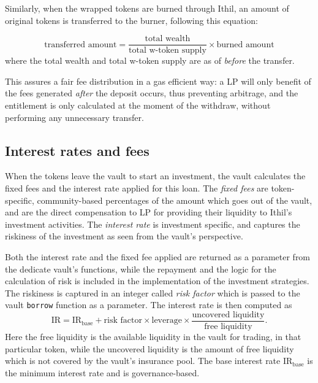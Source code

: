 \documentclass [10pt, fancyhdr, twoside] {article}
\begin{document}
Similarly, when the wrapped tokens are burned through Ithil, an amount of original tokens is transferred to the burner, following this equation:

\begin{equation}\label{transferEq}
\text{transferred amount} = \frac{ \text{total wealth}}{\text{total w-token supply}} \times\text{burned amount}
\end{equation}
where the total wealth and total w-token supply are as of \textit{before} the transfer.

This assures a fair fee distribution in a gas efficient way: a LP will only benefit of the fees generated \textit{after} the deposit occurs, thus preventing arbitrage, and the entitlement is only calculated at the moment of the withdraw, without performing any unnecessary transfer.

\subsection{Interest rates and fees}\label{subsectionInterestRates}
When the tokens leave the vault to start an investment, the vault calculates the fixed fees and the interest rate applied for this loan. The \textit{fixed fees} are token-specific, community-based percentages of the amount which goes out of the vault, and are the direct compensation to LP for providing their liquidity to Ithil's investment activities. The \textit{interest rate} is investment specific, and captures the riskiness of the investment as seen from the vault's perspective.

Both the interest rate and the fixed fee applied are returned as a parameter from the dedicate vault's functions, while the repayment and the logic for the calculation of risk is included in the implementation of the investment strategies. The riskiness is captured in an integer called \textit{risk factor} which is passed to the vault \verb|borrow| function as a parameter. The interest rate is then computed as
\begin{equation}\label{interestRate}
\text{IR} = \text{IR}_\text{base} + \text{risk factor}\times\text{leverage} \times\frac{\text{uncovered liquidity}}{\text{free liquidity}}.
\end{equation}
Here the free liquidity is the available liquidity in the vault for trading, in that particular token, while the uncovered liquidity is the amount of free liquidity which is not covered by the vault's insurance pool. The base interest rate $\text{IR}_\text{base}$ is the minimum interest rate and is governance-based.
\end{document}
